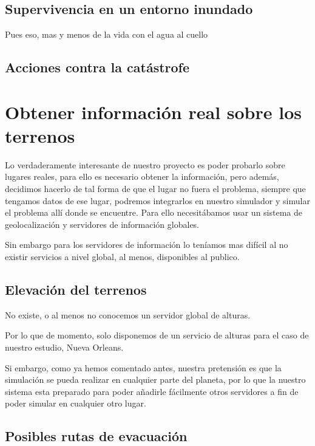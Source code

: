 \subsection*{Supervivencia en un entorno inundado}

Pues eso, mas y menos de la vida con el agua al cuello

\subsection*{Acciones contra la catástrofe}



\section*{Obtener información real sobre los terrenos}

Lo verdaderamente interesante de nuestro proyecto es poder probarlo sobre lugares reales, para ello es necesario obtener la información, pero además, decidimos hacerlo de tal forma de que el lugar no fuera el problema, siempre que tengamos datos de ese lugar, podremos integrarlos en nuestro simulador y simular el problema allí donde se encuentre. Para ello necesitábamos usar un sistema de geolocalización y servidores de información globales.

Sin embargo para los servidores de información lo teníamos mas difícil al no existir servicios a nivel global, al menos, disponibles al publico.

\subsection*{Elevación del terrenos}

No existe, o al menos no conocemos un servidor global de alturas.

Por lo que de momento, solo disponemos de un servicio de alturas para el caso de nuestro estudio, Nueva Orleans.

Si embargo, como ya hemos comentado antes, nuestra pretensión es que la simulación se pueda realizar en cualquier parte del planeta, por lo que la nuestro sistema esta preparado para poder añadirle fácilmente otros servidores a fin de poder simular en cualquier otro lugar. 

\subsection*{Posibles rutas de evacuación}


